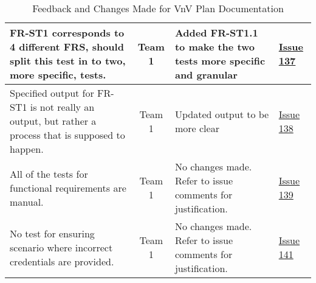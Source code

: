 \documentclass{article}
\begin{document}
\begin{table}[H]
\begin{tabularx}{\textwidth}{|X|c|X|p{1.5cm}|}
    \hline
    FR-ST1 corresponds to 4 different FRS, should split this test in to two,
    more specific, tests. & Team 1 & Added FR-ST1.1 to make the two tests more
    specific and granular &
    \href{https://github.com/SumanyaG/Alkalytics/issues/137}{Issue 137} \\
    \hline
    Specified output for FR-ST1 is not really an output, but rather a process
    that is supposed to happen. & Team 1 & Updated output to be more clear &
    \href{https://github.com/SumanyaG/Alkalytics/issues/138}{Issue 138} \\
    \hline
    All of the tests for functional requirements are manual. & Team 1 & No
    changes made. Refer to issue comments for justification. &
    \href{https://github.com/SumanyaG/Alkalytics/issues/139}{Issue 139} \\
    \hline
    No test for ensuring scenario where incorrect credentials are provided. &
    Team 1 & No changes made. Refer to issue comments for justification. &
    \href{https://github.com/SumanyaG/Alkalytics/issues/141}{Issue 141} \\
    \hline
\end{tabularx}
\caption{Feedback and Changes Made for VnV Plan Documentation}
\label{table:VnV1}
\end{table}
\end{document}
